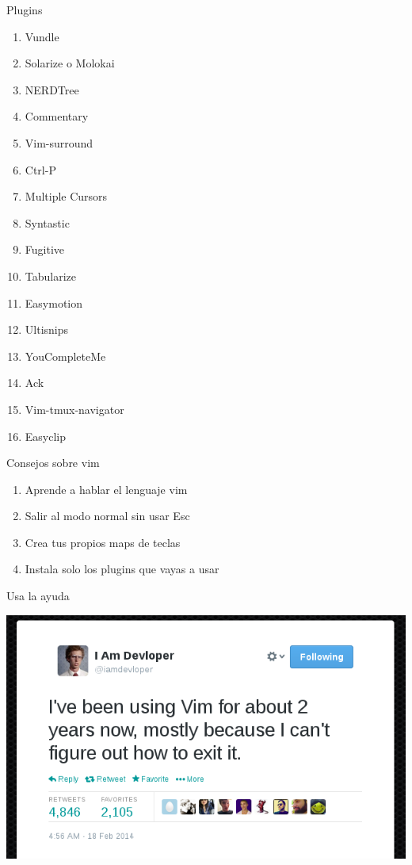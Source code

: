 \documentclass{beamer}
\begin{document}
\begin{frame}{Plugins}
  \begin{enumerate}
  \item Vundle
  \item Solarize o Molokai
  \item NERDTree
  \item Commentary
  \item Vim-surround
  \item Ctrl-P
  \item Multiple Cursors
  \item Syntastic
  \item Fugitive
  \item Tabularize
  \item Easymotion
  \item Ultisnips
  \item YouCompleteMe
  \item Ack
  \item Vim-tmux-navigator
  \item Easyclip
  \end{enumerate}
\end{frame}

\begin{frame}{Consejos sobre vim}
  \begin{enumerate}
  \item Aprende a hablar el lenguaje vim
  \item Salir al modo normal sin usar Esc
  \item Crea tus propios maps de teclas
  \item Instala solo los plugins que vayas a usar
  \end{enumerate}
\end{frame}
\begin{frame}{Usa la ayuda}
    \begin{center}
    \includegraphics[width=\paperwidth]{usehelp}
    \end{center}
\end{frame}
\end{document}

